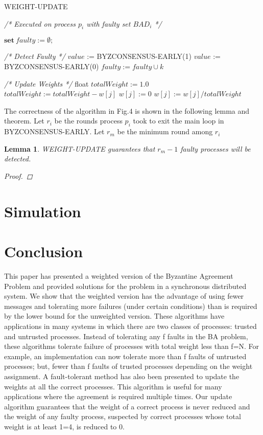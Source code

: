 \documentclass[conference]{IEEEtran}
\newtheorem{l1}{Lemma}
\begin{document}
\begin{algorithm}
\caption{WEIGHT-UPDATE}\label{euclid}
\textit{/* Executed on process $p_{i}$ with faulty set $BAD_{i} $ */}

\begin{algorithmic}[1]
\STATE $\textbf{set} ~\textit{faulty} := \emptyset;$
\item[]
\item[]
\textit{/* Detect Faulty */}
\STATE $value$ := BYZCONSENSUS-EARLY(1)
\ELSE
\STATE $value$ := BYZCONSENSUS-EARLY(0)
\ENDIF
{} 
\STATE $faulty := faulty \cup {k}$
\ENDIF
\ENDFOR
\item[]
\item[]
\textit{/* Update Weights */}
\STATE float $totalWeight := 1.0$
\STATE $totalWeight := totalWeight - w[j]$
\STATE $w[j] := 0$
\ENDFOR
{}
\STATE $w[j] := w[j]/totalWeight$
\ENDFOR
\end{algorithmic}
\end{algorithm}

The correctness of the algorithm in Fig.4 is shown in the following lemma and theorem. Let $r_i$ be the rounds process $p_i$ took to exit the main loop in BYZCONSENSUS-EARLY. Let $r_m$ be the minimum round among $r_i$  

\begin{l1}
WEIGHT-UPDATE guarantees that $r_m - 1$ faulty processes will be detected. 
\begin{proof}

\end{proof}
\end{l1}


\section{Simulation}

\section{Conclusion}
This paper has presented a weighted version of the Byzantine Agreement Problem and provided solutions for the problem in a synchronous distributed system. We show that the
weighted version has the advantage of using fewer messages
and tolerating more failures (under certain conditions) than
is required by the lower bound for the unweighted version.
These algorithms have applications in many systems in which
there are two classes of processes: trusted and untrusted
processes. Instead of tolerating any f faults in the BA problem,
these algorithms tolerate failure of processes with total weight
less than f=N. For example, an implementation can now
tolerate more than f faults of untrusted processes; but, fewer
than f faults of trusted processes depending on the weight
assignment. A fault-tolerant method has also been presented
to update the weights at all the correct processes. This algorithm is useful for many applications where the agreement is
required multiple times. Our update algorithm guarantees that
the weight of a correct process is never reduced and the weight
of any faulty process, suspected by correct processes whose
total weight is at least 1=4, is reduced to 0.
\end{document}
